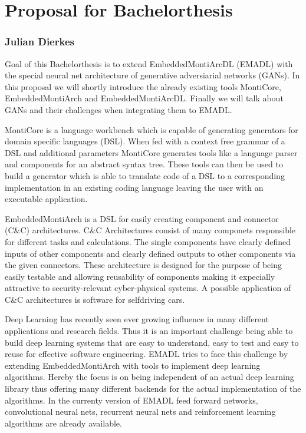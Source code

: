 \documentclass[12pt, a4paper]{scrartcl}
\begin{document}
\pagestyle{empty}

\section*{Proposal for Bachelorthesis}
\subsubsection*{Julian Dierkes}

Goal of this Bachelorthesis is to extend EmbeddedMontiArcDL (EMADL) with the special neural net
architecture of generative adversiarial networks (GANs). In this proposal we will shortly introduce
the already existing tools MontiCore, EmbeddedMontiArch and EmbeddedMontiArcDL. Finally we will
talk about GANs and their challenges when integrating them to EMADL.

\bigskip

MontiCore is a language workbench which is capable of generating generators for domain specific
languages (DSL). When fed with a context free grammar of a DSL and additional parameters MontiCore 
generates tools like a language parser and components for an abstract syntax tree. These tools
can then be used to build a generator which is able to translate code of a DSL to a corresponding
implementation in an existing coding language leaving the user with an executable application.

\bigskip

EmbeddedMontiArch is a DSL for easily creating component and connector (C\&C) architectures.
C\&C Architectures consist of many componets responsible for different tasks and calculations. The
single components have clearly defined inputs of other components and clearly defined outputs to
other components via the given connectors. These architecture is designed for the purpose of being
easily testable and allowing reusability of components making it
expecially attractive to security-relevant cyber-physical systems. A possible application of C\&C
architectures is software for selfdriving cars.

\bigskip

Deep Learning has recently seen ever growing influence in many different applications and research
fields. Thus it is an important challenge being able to build deep learning systems that are easy to understand, 
easy to test and easy to reuse for effective software engineering. EMADL tries to face this challenge by extending
EmbeddedMontiArch with tools to implement deep learning algorithms. Hereby the focus is on being
independent of an actual deep learning library thus offering many different backends for the actual
implementation of the algorithms. In the currenty version of EMADL feed forward networks,
convolutional neural nets, recurrent neural nets and reinforcement learning algorithms are already
available.
\end{document}
